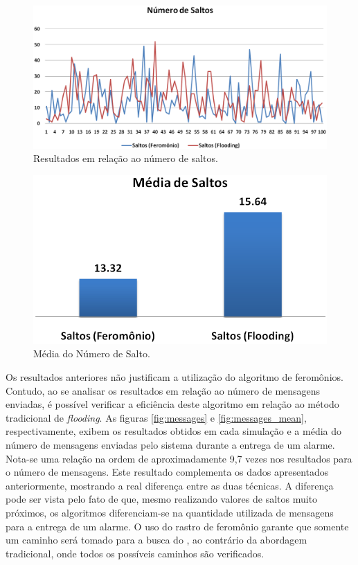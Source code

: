  \begin{figure}[h!]
 \centering
 \includegraphics[width=13cm]{results/hops.png}
 \caption{Resultados em relação ao número de saltos.}
  \label{fig:hops}
 \end{figure}


 \begin{figure}[h!]
 \centering
 \includegraphics{results/hops_mean.png}
 \caption{Média do Número de Salto.}
  \label{fig:hops_mean}
 \end{figure}

Os resultados anteriores não justificam a utilização do algoritmo de feromônios. Contudo, ao se analisar os resultados em relação ao número de mensagens enviadas, é possível verificar a eficiência deste algoritmo em relação ao método tradicional de \emph{flooding}. As figuras \ref{fig:messages} e \ref{fig:messages_mean}, respectivamente, exibem os resultados obtidos em cada simulação e a média do número de mensagens enviadas pelo sistema durante a entrega de um alarme. Nota-se uma relação na ordem de aproximadamente 9,7 vezes nos resultados para o número de mensagens. Este resultado complementa os dados apresentados anteriormente, mostrando a real diferença entre as duas técnicas. A diferença pode ser vista pelo fato de que, mesmo realizando valores de saltos muito próximos, os algoritmos diferenciam-se na quantidade utilizada de mensagens para a entrega de um alarme. O uso do rastro de feromônio garante que somente um caminho será tomado para a busca do \vant, ao contrário da abordagem tradicional, onde todos os possíveis caminhos são verificados.

